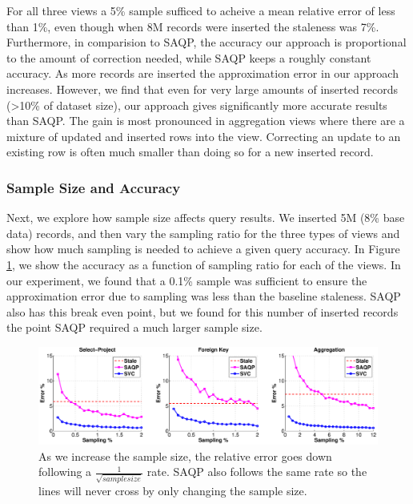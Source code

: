 For all three views a 5\% sample sufficed to acheive a mean relative error of less than 1\%, even though when 8M records were inserted the staleness was 7\%.
Furthermore, in comparision to SAQP, the accuracy our approach is proportional to the amount of correction needed, while SAQP keeps a roughly constant accuracy.
As more records are inserted the approximation error in our approach increases.
However, we find that even for very large amounts of inserted records (>10\% of dataset size), our approach gives significantly more accurate results
than SAQP.
The gain is most pronounced in aggregation views where there are a mixture of updated and inserted rows into the view.
Correcting an update to an existing row is often much smaller than doing so for a new inserted record.

\subsubsection{Sample Size and Accuracy} Next, we explore how sample size affects query results.
We inserted 5M (8\% base data) records, and then vary the sampling ratio for the three types of views and show how much sampling is needed to achieve a given query accuracy.
In Figure \ref{exp1sample}, we show the accuracy as a function of sampling ratio for each of the views.
In our experiment, we found that a 0.1\% sample was sufficient to ensure the approximation error due to sampling was less than the baseline staleness.
SAQP also has this break even point, but we found for this number of inserted records the point SAQP required a much larger sample size.

\begin{figure}[ht!]
\hspace{-4em}
 \includegraphics[scale=0.22]{exp/exp1-samplesize-accuracy.eps}
 \caption{As we increase the sample size, the relative error goes down following a $\frac{1}{\sqrt{samplesize}}$ rate. SAQP also follows the same rate so the lines will never cross by only changing the sample size. \label{exp1sample} }
\end{figure}


